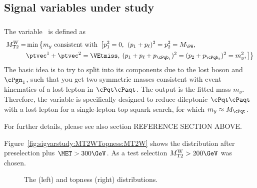 \subsection{Signal variables under study}
\label{sec:sigvarstudy:variables}

\subsubsection{\MTtW}

The \MTtW variable~\cite{Bai:2012gs} is defined as
\begin{align}
\MTt^W = &\min\left\{m_y\text{ consistent with } \left[ p_1^2 = 0, \right.\right. 
(p_1+p_\ell)^2 = p_2^2 = M_{\PW}, \\
& \ptvec^1+\ptvec^2 = \VEtmiss, 
\left.\left. (p_1+p_\ell+p_{\cPqb_1})^2=(p_2+p_{\cPqb_2})^2 = m_y^2,\right]\right\} \nonumber
\end{align}
The basic idea is to try to split \MET into its components due to the lost \PW boson and $\cPgn_1$, such that you get two symmetric masses consistent with event kinematics of a lost lepton in $\cPqt\cPaqt$.
The output is the fitted mass $m_y$.
Therefore, the variable is specifically designed to reduce dileptonic $\cPqt\cPaqt$ with a lost lepton for a single-lepton top squark search, for which $m_y \approx M_{\cPqt}$.

For further details, please see also section {\color{red} REFERENCE SECTION ABOVE}.

Figure~\ref{fig:sigvarstudy:MT2WTopness:MT2W} shows the \MTtW distribution after preselection plus $\MET>300\GeV$. As a test selection $\MTtW>200\GeV$ was chosen.

\begin{figure}
\caption{\label{fig:sigvarstudy:MT2WTopness} The \MTtW (left) and topness (right) distributions.}
\end{figure}

